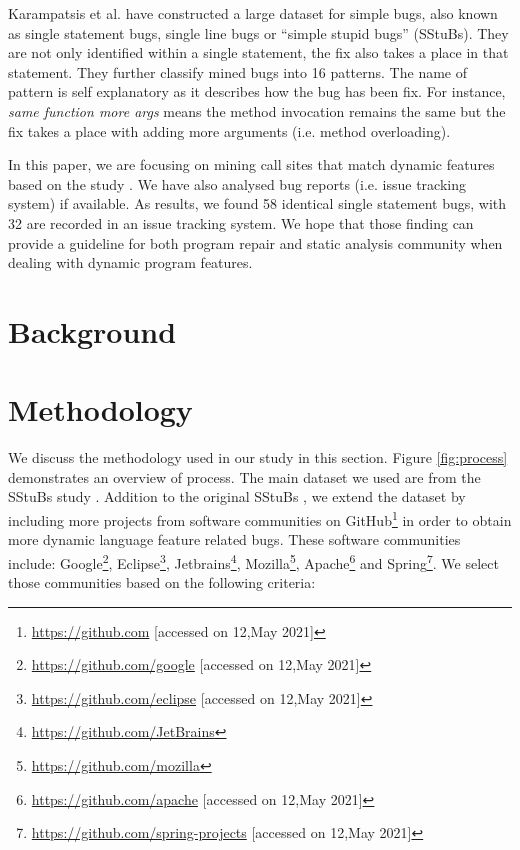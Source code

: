 \documentclass[sigconf,review,anonymous]{acmart}
\begin{document}
Karampatsis et al. \cite{karampatsis2020often} have constructed a large dataset for simple bugs, also known as single statement bugs, single line bugs or ``simple stupid bugs'' (SStuBs). They are not only identified within a single statement, the fix also takes a place in that statement. They further classify mined bugs into 16 patterns. %
The name of pattern is self explanatory as it describes how the bug has been fix. For instance, \textit{same function more args} means the method invocation remains the same but the fix takes a place with adding more arguments (i.e. method overloading). 

In this paper, we are focusing on mining call sites that match dynamic features based on the study \cite{sui2018soundness}. We have also analysed bug reports (i.e. issue tracking system) if available.  As results, we found 58 identical single statement bugs, with 32 are recorded in an issue tracking system. We hope that those finding can provide a guideline for both program repair and static analysis community when dealing with dynamic program features.

\section{Background}


\section{Methodology}
We discuss the methodology used in our study in this section. Figure \ref{fig:process} demonstrates an overview of process. The main dataset we used are from the SStuBs study \cite{karampatsis2020often}. Addition to the original SStuBs \cite{karampatsis2020often}, we extend the dataset by including more projects from software communities on GitHub\footnote{\url{https://github.com} [accessed on 12,May 2021]} in order to obtain more dynamic language feature related bugs. These software communities include: Google\footnote{\url{https://github.com/google} [accessed on 12,May 2021]}, Eclipse\footnote{\url{https://github.com/eclipse} [accessed on 12,May 2021]}, Jetbrains\footnote{\url{https://github.com/JetBrains}}, Mozilla\footnote{\url{https://github.com/mozilla}}, Apache\footnote{\url{https://github.com/apache} [accessed on 12,May 2021]} and Spring\footnote{\url{https://github.com/spring-projects} [accessed on 12,May 2021]}. We select those communities based on the following criteria: 
\end{document}
